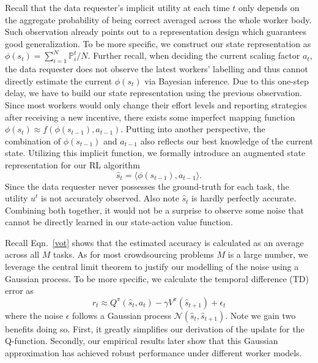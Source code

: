 Recall that the data requester's implicit utility at each time $t$ only depends on the aggregate probability of being correct averaged across the whole worker body. Such observation already points out to a  representation design which guarantees good generalization. To be more specific, we construct our state representation as 
$\phi(s_t) = \sum_{i=1}^N \mathbb{P}^t_i/N.$
Further recall, when deciding the current scaling factor $a_t$, the data requester does not observe the latest workers' labelling and thus cannot directly estimate the current $\phi(s_t)$ via Bayesian inference. Due to this one-step delay, we have to build our state representation using the previous observation. Since most workers would only change their effort levels and reporting strategies after receiving a new incentive, there exists some imperfect mapping function $\phi(s_{t}) \approx f(\phi(s_{t-1}),a_{t-1})$. Putting into another perspective, the combination of $\phi(s_{t-1})$ and $a_{t-1}$ also reflects our best knowledge of the current state. Utilizing this implicit function, we formally introduce an augmented state representation for our RL algorithm
$$
\hat{s}_t = \langle \phi(s_{t-1}), a_{t-1} \rangle .
$$
Since the data requester never possesses the ground-truth for each task, the utility $u^t$ is not accurately observed. Also note $\hat{s}_t$ is hardly perfectly accurate. %
Combining both together, it would not be a surprise to observe some noise that cannot be directly learned in our state-action value function. 


Recall Eqn.~\ref{vot} shows that the estimated accuracy is calculated as an average across all $M$ tasks. 
As for most crowdsourcing problems $M$ is a large number, we leverage the central limit theorem to justify our modelling of the noise using a Gaussian process.
To be more specific, we calculate the temporal difference (TD) error as 
$$
r_t \approx Q^\pi(\hat{s}_t, a_t) - \gamma V^\pi(\hat{s}_{t+1}) + \epsilon_t $$
where the noise $\epsilon $ follows a Gaussian process $\mathcal{N}(\hat{s}_t,\hat{s}_{t+1})$. Note we gain two benefits doing so. First, it greatly simplifies our derivation of the update for the Q-function. Secondly, our empirical results later show that this Gaussian approximation has achieved robust performance under different worker models.  


